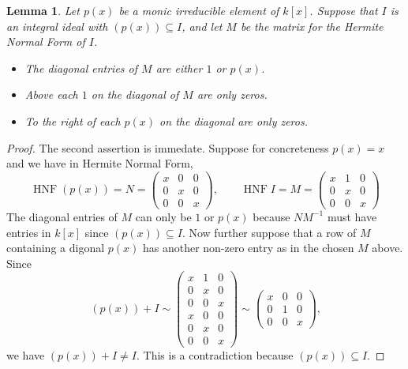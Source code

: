 \documentclass[12pt,reqno]{amsart}
\numberwithin{equation}{section}
\newtheorem{lemma}[theorem]{Lemma}
\newcommand{\op}[1]  { \operatorname{ #1 }}
\begin{document}
\begin{lemma}
\label{lemma_primeform}
Let $p(x)$ be a monic irreducible element of $k[x]$. Suppose that $I$ is an integral ideal with $(p(x)) \subseteq I$, and let $M$ be the matrix for the Hermite Normal Form of $I$.
\begin{itemize}
 \item The diagonal entries of $M$ are either $1$ or $p(x)$.
 \item Above each $1$ on the diagonal of $M$ are only zeros.
 \item To the right of each $p(x)$ on the diagonal are only zeros.
\end{itemize}
\end{lemma}
\begin{proof}
The second assertion is immedate.
Suppose for concreteness $p(x)=x$ and we have in Hermite Normal Form,
\begin{equation*}
 \op{HNF}(p(x)) = N = \left(\begin{array}{ccc}
             x & 0 & 0 \\
             0 & x & 0 \\
             0 & 0 & x
            \end{array}\right), \quad \quad
\op{HNF}I = M = \left(\begin{array}{ccc}
             x & 1 & 0 \\
             0 & x & 0 \\
             0 & 0 & x
            \end{array}\right)
\end{equation*}
The diagonal entries of $M$ can only be $1$ or $p(x)$ because $NM^{-1}$ must have entries in $k[x]$ since $(p(x)) \subseteq I$. Now further suppose that a row of $M$ containing a digonal $p(x)$ has another non-zero entry as in the chosen $M$ above. Since
\begin{equation*}
 (p(x)) + I \sim \left(\begin{array}{ccc}
             x & 1 & 0 \\
             0 & x & 0 \\
             0 & 0 & x \\
             x & 0 & 0 \\
             0 & x & 0 \\
             0 & 0 & x
            \end{array}\right) \sim \left(\begin{array}{ccc}
             x & 0 & 0 \\
             0 & 1 & 0 \\
             0 & 0 & x
            \end{array}\right)\text{,}
\end{equation*}
we have $(p(x)) + I \neq I$. This is a contradiction because $(p(x)) \subseteq I$.

\end{proof}
\end{document}
